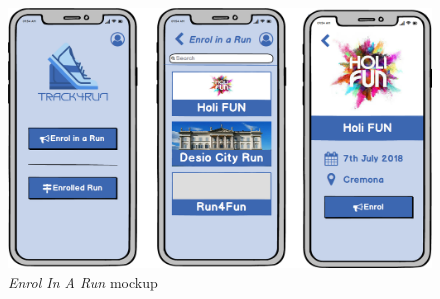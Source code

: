 \begin{figure}
\begin{center}
  \includegraphics[width=\textwidth]{img/mockup/EnrolRun.png}
  \hspace{0.05\linewidth}
  \centering
  \caption{\textit{Enrol In A Run} mockup}
  \label{img:enrolInARunMockup}
\end{center}
\end{figure}
